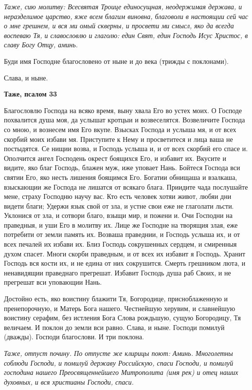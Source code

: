 \itshape Таже, сию молитву:\normalfont{} Всесвятая Троице единосущная, неодержимая держава, и неразделимое царство, яже всем благим виновна, благоволи в настоящии сей час о мне грешнем, и вся ми омый скверны, и просвети ми смысл, яко да всегда воспеваю Тя, и славословлю и глаголю: един Свят, един Господь Исус Христос, в славу Богу Отцу, аминь.


Буди имя Господне благословено от ныне и до века (трижды с поклонами).


Слава, и ныне.





\bfseries Таже, псалом 33\normalfont{}


Благословлю Господа на всяко время, выну хвала Его во устех моих. О Господе похвалится душа моя, да услышат кротцыи и возвеселятся. Возвеличите Господа со мною, и вознесем имя Его вкупе. Взысках Господа и услыша мя, и от всех скорбий моих избави мя. Приступите к Нему и просветитеся и лица ваша не постыдятся. Се нищии возва, и Господь услыша и, и от всех скорбий его спасе и. Ополчится ангел Господень окрест боящихся Его, и избавит их. Вкусите и видите, яко благ Господь, блажен муж, иже уповает Нань. Бойтеся Господа вси святии Его, яко несть лишения боящимся Его. Богатии обнищаша и взалкаша, взыскающии же Господа не лишатся от всякаго блага. Приидите чада послушайте мене, страху Господню научу вас. Кто есть человек хотяи живот, любяи дни видети благи; Удержи язык свой от зла, и устне свои еже не глаголати льсти. Уклонися от зла, и сотвори благо, взыщи мир, и пожени и. Очи Господни на праведныя, и уши Его в молитву их. Лице же Господне на творящия злая, еже потребити от земли память их. Возваша праведнии, и Господь услыша их, и от всех печалей их избави их. Близ Господь сокрушенных сердцем, и смиренныя духом спасет. Многи скорби праведным, и от всех их избавит я Господь. Хранит Господь вся кости их, и не едина от них сокрушится. Смерть грешником люта, и ненавидящии праведнаго прегрешат. Избавит Господь душа раб Своих, и не прегрешат вси уповающии Нань.


Достойно есть, яко воистину блажити Тя, Богородице, присноблаженную и пренепорочную, и Матерь Бога нашего. Честнейшую херувим, и славнейшую воистину серафим, без истления Бога Слова рождьшую, сущую Богородицу, Тя величаем. И поклон до земли вси равно. Слава, и ныне. Господи помилуй (дважды). Господи благослови. И три поклона.


\itshape Таже, отпуст почину. По отпусте же клирицы поют:\normalfont{} Аминь. Многолетны соблюди Господи, и помилуй державу Российскую, спаси Господи, и помилуй господина нашего Преосвященнейшего Митрополита (имя рек) и отец наших духовных, и вся христианы Господи, спаси.


